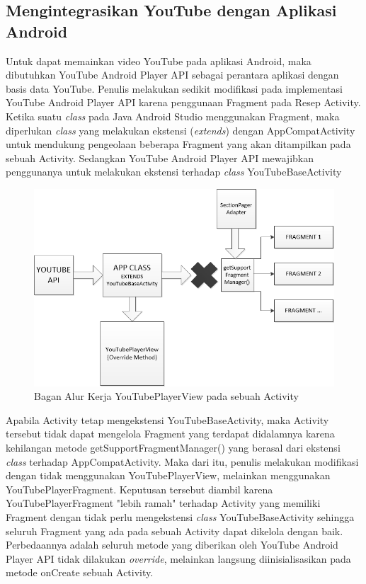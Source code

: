 	\subsection{Mengintegrasikan YouTube dengan Aplikasi Android}
		 Untuk dapat memainkan video YouTube pada aplikasi Android, maka dibutuhkan YouTube Android Player API sebagai perantara aplikasi dengan basis data YouTube. Penulis melakukan sedikit modifikasi pada implementasi YouTube Android Player API karena penggunaan Fragment pada Resep Activity. Ketika suatu \textit{class} pada Java Android Studio menggunakan Fragment, maka diperlukan \textit{class} yang melakukan ekstensi (\textit{extends}) dengan AppCompatActivity untuk mendukung pengeolaan beberapa Fragment yang akan ditampilkan pada sebuah Activity. Sedangkan YouTube Android Player API mewajibkan penggunanya untuk melakukan ekstensi terhadap \textit{class} YouTubeBaseActivity
 		\begin{figure}[H]
		 	\centering
		 	\includegraphics[width=1\textwidth]{gambar/new/youtube_player_view}
		 	\caption{Bagan Alur Kerja YouTubePlayerView pada sebuah Activity}
		 	\label{youtube-player-view}
		 \end{figure}
		\vspace{1cm}
		Apabila Activity tetap mengekstensi YouTubeBaseActivity, maka Activity tersebut tidak dapat mengelola Fragment yang terdapat didalamnya karena kehilangan metode getSupportFragmentManager() yang berasal dari ekstensi \textit{class} terhadap AppCompatActivity. Maka dari itu, penulis melakukan modifikasi dengan tidak menggunakan YouTubePlayerView, melainkan menggunakan YouTubePlayerFragment. Keputusan tersebut diambil karena YouTubePlayerFragment "lebih ramah" terhadap Activity yang memiliki Fragment dengan tidak perlu mengekstensi \textit{class} YouTubeBaseActivity sehingga seluruh Fragment yang ada pada sebuah Activity dapat dikelola dengan baik. Perbedaannya adalah seluruh metode yang diberikan oleh YouTube Android Player API tidak dilakukan \textit{override}, melainkan langsung diinisialisasikan pada metode onCreate sebuah Activity. 
